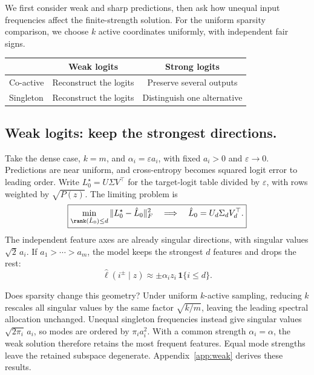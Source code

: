 We first consider weak and sharp predictions, then ask how
unequal input frequencies affect the finite-strength solution.
For the uniform sparsity comparison, we choose $k$ active
coordinates uniformly, with independent fair signs.
\begin{center}
\renewcommand{\arraystretch}{1.12}
\begin{tabular}{@{}lcc@{}}
\toprule
 & Weak logits & Strong logits\\
\midrule
Co-active & Reconstruct the logits & Preserve several outputs\\
Singleton & Reconstruct the logits & Distinguish one alternative\\
\bottomrule
\end{tabular}
\end{center}

\subsection{Weak logits: keep the strongest directions.}

Take the dense case, $k=m$, and $\alpha_i=\varepsilon a_i$,
with fixed $a_i>0$ and $\varepsilon\to0$. Predictions are near
uniform, and cross-entropy becomes squared logit error to leading
order. Write $L_0^\star=U\Sigma V^\top$ for the target-logit table
divided by $\varepsilon$, with rows weighted by $\sqrt{P(z)}$.
The limiting problem is
\begin{equation}
\boxed{
\min_{\rank(\hat L_0)\le d}
\|L_0^\star-\hat L_0\|_F^2
\quad\Longrightarrow\quad
\hat L_0=U_d\Sigma_dV_d^\top.
}
\label{eq:svd}
\end{equation}
The independent feature axes are already singular directions,
with singular values $\sqrt2\,a_i$. If $a_1>\cdots>a_m$, the model
keeps the strongest $d$ features and drops the rest:
\begin{equation}
\hat\ell(i^\pm\mid z)
\approx
\pm\alpha_i z_i\,\mathbf1\{i\le d\}.
\label{eq:truncation}
\end{equation}

Does sparsity change this geometry? Under uniform $k$-active
sampling, reducing $k$ rescales all singular values by the same
factor $\sqrt{k/m}$, leaving the leading spectral allocation
unchanged. Unequal singleton frequencies instead give singular
values $\sqrt{2\pi_i}\,a_i$, so modes are ordered by
$\pi_i a_i^2$. With a common strength $\alpha_i=\alpha$, the
weak solution therefore retains the most frequent features.
Equal mode strengths leave the retained subspace degenerate.
Appendix~\ref{app:weak} derives these results.

